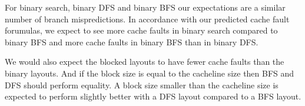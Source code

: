 For binary search, binary DFS and binary BFS our expectations are a similar number of branch mispredictions. In accordance with our predicted cache fault forumulas, we expect to see more cache faults in binary search compared to binary BFS and more cache faults in binary BFS than in binary DFS.

We would also expect the blocked layouts to have fewer cache faults than the binary layouts. And if the block size is equal to the cacheline size then BFS and DFS should perform equality. A block size smaller than the cacheline size is expected to perform slightly better with a DFS layout compared to a BFS layout.

